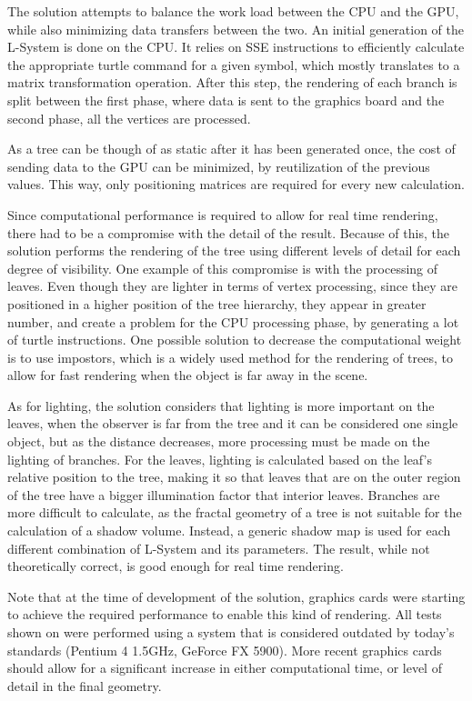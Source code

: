 \documentclass{acmtog}
\begin{document}
The solution attempts to balance the work load between the CPU and the GPU, while also minimizing data transfers between the two. An initial generation of the L-System is done on the CPU. It relies on SSE instructions to efficiently calculate the appropriate turtle command for a given symbol, which mostly translates to a matrix transformation operation. After this step, the rendering of each branch is split between the first phase, where data is sent to the graphics board and the second phase, all the vertices are processed.

As a tree can be though of as static after it has been generated once, the cost of sending data to the GPU can be minimized, by reutilization of the previous values. This way, only positioning matrices are required for every new calculation.

Since computational performance is required to allow for real time rendering, there had to be a compromise with the detail of the result. Because of this, the solution performs the rendering of the tree using different levels of detail for each degree of visibility. One example of this compromise is with the processing of leaves. Even though they are lighter in terms of vertex processing, since they are positioned in a higher position of the tree hierarchy, they appear in greater number, and create a problem for the CPU processing phase, by generating a lot of turtle instructions.
One possible solution to decrease the computational weight is to use impostors, which is a widely used method for the rendering of trees, to allow for fast rendering when the object is far away in the scene.

As for lighting, the solution considers that lighting is more important on the leaves, when the observer is far from the tree and it can be considered one single object, but as the distance decreases, more processing must be made on the lighting of branches. For the leaves, lighting is calculated based on the leaf's relative position to the tree, making it so that leaves that are on the outer region of the tree have a bigger illumination factor that interior leaves. Branches are more difficult to calculate, as the fractal geometry of a tree is not suitable for the calculation of a shadow volume. Instead, a generic shadow map is used for each different combination of L-System and its parameters. The result, while not theoretically correct, is good enough for real time rendering.

Note that at the time of development of the solution, graphics cards were starting to achieve the required performance to enable this kind of rendering. All tests shown on \cite{baele2005real} were performed using a system that is considered outdated by today's standards (Pentium 4 1.5GHz, GeForce FX 5900). More recent graphics cards should allow for a significant increase in either computational time, or level of detail in the final geometry.
\end{document}
